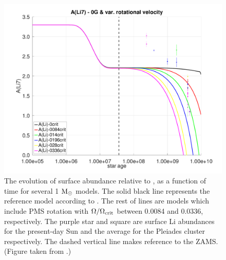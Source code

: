 \documentclass[fleqn,usenatbib]{mnras}
\begin{document}
\begin{figure}
	\includegraphics[trim = 25mm 10mm 15mm 10mm, clip, width=\columnwidth]{figures/paper2/li_var_vel_0_0g_0.pdf}
    \caption{The evolution of surface  abundance relative to , as a function of time for several 1 $\mathrm{M}_\odot$ models. The solid black line represents the reference model according to \citet{Choi2016}. The rest of lines are models which include PMS rotation with $\Omega / \Omega_{\mathrm{crit}}$ between 0.0084 and 0.0336, respectively. The purple star and square are surface Li abundances for the present-day Sun \citep{Asplund2009} and the average for the Pleiades cluster \citep{Sestito2005} respectively. The dashed vertical line makes reference to the ZAMS. (Figure taken from \citet{Navarro2020}.)}
    \label{fig:li_var_vel_0g}
\end{figure}
\end{document}
